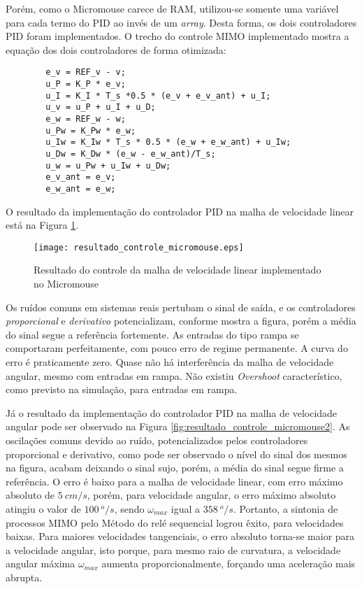 	Porém, como o Micromouse carece de RAM, utilizou-se somente uma variável para cada termo do PID ao invés de um \emph{array}. Desta forma, os dois controladores PID foram implementados. O trecho do controle MIMO implementado mostra a equação dos dois controladores de forma otimizada:
\begin{verbatim}
		e_v = REF_v - v; 
		u_P = K_P * e_v; 
		u_I = K_I * T_s *0.5 * (e_v + e_v_ant) + u_I; 
		u_v = u_P + u_I + u_D;
		e_w = REF_w - w;
		u_Pw = K_Pw * e_w;
		u_Iw = K_Iw * T_s * 0.5 * (e_w + e_w_ant) + u_Iw;
		u_Dw = K_Dw * (e_w - e_w_ant)/T_s;
		u_w = u_Pw + u_Iw + u_Dw;
		e_v_ant = e_v;
		e_w_ant = e_w;
\end{verbatim}

	O resultado da implementação do controlador PID na malha de velocidade linear está na Figura \ref{fig:resultado_controle_micromouse}. 
	
\begin{figure}[!htb]
	\caption{\label{fig:resultado_controle_micromouse}Resultado do controle da malha de velocidade linear implementado no Micromouse}
	\begin{center}
		\texttt{[image: resultado\_controle\_micromouse.eps]}
	\end{center}
\end{figure}

Os ruídos comuns em sistemas reais pertubam o sinal de saída, e os controladores \emph{proporcional} e \emph{derivativo} potencializam, conforme mostra a figura, porém a média do sinal segue a referência fortemente. As entradas do tipo rampa se comportaram perfeitamente, com pouco erro de regime permanente. A curva do erro é praticamente zero. Quase não há interferência da malha de velocidade angular, mesmo com entradas em rampa. Não existiu \emph{Overshoot} característico, como previsto na simulação, para entradas em rampa.


	Já o resultado da implementação do controlador PID na malha de velocidade angular pode ser observado na Figura \ref{fig:resultado_controle_micromouse2}. As oscilações comuns devido ao ruído, potencializados pelos controladores proporcional e derivativo, como pode ser observado o nível do sinal dos mesmos na figura, acabam deixando o sinal sujo, porém, a média do sinal segue firme a referência. O erro é baixo para a malha de velocidade linear, com erro máximo absoluto de $5~cm/s$, porém, para velocidade angular, o erro máximo absoluto atingiu o valor de $100~^o/s$, sendo $\omega_{max}$ igual a $358~^o/s$. Portanto, a sintonia de processos MIMO pelo Método do relé sequencial logrou êxito, para velocidades baixas. Para maiores velocidades tangenciais, o erro absoluto torna-se maior para a velocidade angular, isto porque, para mesmo raio de curvatura, a velocidade angular máxima $\omega_{max}$ aumenta proporcionalmente, forçando uma aceleração mais abrupta.
	


